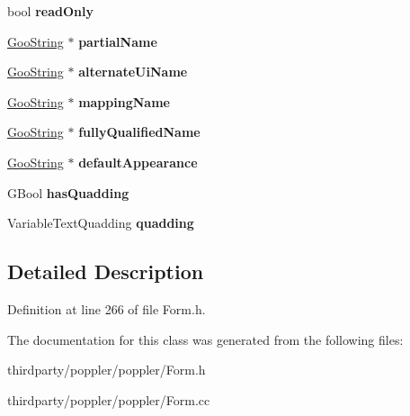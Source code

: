 \begin{DoxyCompactItemize}
\mbox{\label{class_form_field_aacab1ceb351ef5cf0f08c148ea325aea}} 
bool {\bfseries read\+Only}
\item 
\mbox{\label{class_form_field_ac2dbfcda765ad82e78f94dac5e09a016}} 
\hyperlink{class_goo_string}{Goo\+String} $\ast$ {\bfseries partial\+Name}
\item 
\mbox{\label{class_form_field_a92bc86d0871b45b51f847dfc3ae0ebcd}} 
\hyperlink{class_goo_string}{Goo\+String} $\ast$ {\bfseries alternate\+Ui\+Name}
\item 
\mbox{\label{class_form_field_add0a61c87abe73dbf109032b93bc82f9}} 
\hyperlink{class_goo_string}{Goo\+String} $\ast$ {\bfseries mapping\+Name}
\item 
\mbox{\label{class_form_field_a065abd4e79a2159665832de6ab1a4b4d}} 
\hyperlink{class_goo_string}{Goo\+String} $\ast$ {\bfseries fully\+Qualified\+Name}
\item 
\mbox{\label{class_form_field_ac1cc768824faedd8bd383048d8c52b87}} 
\hyperlink{class_goo_string}{Goo\+String} $\ast$ {\bfseries default\+Appearance}
\item 
\mbox{\label{class_form_field_a93b2c1eb26f7f905fd6f3f6ff9e84b4b}} 
G\+Bool {\bfseries has\+Quadding}
\item 
\mbox{\label{class_form_field_ab97c8fdec49637c4e8cb91d9b25424ed}} 
Variable\+Text\+Quadding {\bfseries quadding}
\end{DoxyCompactItemize}


\subsection{Detailed Description}


Definition at line 266 of file Form.\+h.



The documentation for this class was generated from the following files\+:\begin{DoxyCompactItemize}
\item 
thirdparty/poppler/poppler/Form.\+h\item 
thirdparty/poppler/poppler/Form.\+cc\end{DoxyCompactItemize}

